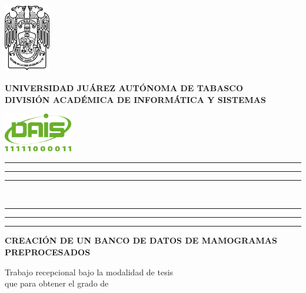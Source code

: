 {{    %
    \begin{minipage}[ht]{0.14\textwidth}
        \flushleft
        \includegraphics[width=2cm]{images/logo-ujat}
    \end{minipage}
    \begin{minipage}[ht]{0.70\textwidth}
    \centering
    {\selectfont
    {\bfseries{\normalsize UNIVERSIDAD JUÁREZ AUTÓNOMA DE TABASCO}}\\
    {\bfseries{\normalsize DIVISIÓN ACADÉMICA DE INFORMÁTICA Y SISTEMAS}}}
    \end{minipage}
    \begin{minipage}[ht]{0.14\textwidth}
        \flushright
        \includegraphics[width=3cm]{images/logo-dais}
    \end{minipage}

    \rule{\textwidth}{3pt}\vspace*{-\baselineskip}\vspace{7pt} 
    \rule{\textwidth}{4pt}\vspace*{-\baselineskip}\vspace{7pt} 
    \rule{\textwidth}{3pt}\\[\baselineskip] 
    
    \begin{minipage}[ht]{0.10\textwidth}
        \flushleft
        \rule{3pt}{16cm} 
        \rule{4pt}{16cm} 
        \rule{3pt}{16cm} 
    \end{minipage}
    \begin{minipage}[th]{0.89\textwidth}
    \centering
    {\bfseries{\Large CREACIÓN DE UN BANCO DE DATOS DE MAMOGRAMAS
    PREPROCESADOS}}
    \vspace*{2\baselineskip} \vfill

    Trabajo recepcional bajo la modalidad de tesis \\
    que para obtener el grado de\\[\baselineskip] 
    

\end{minipage}}}
